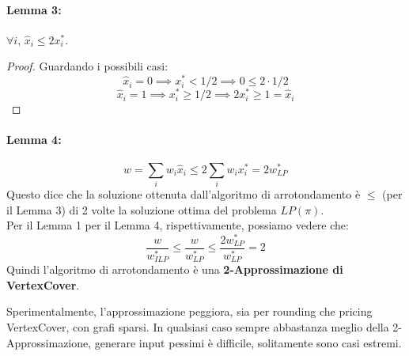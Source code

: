 \newpage

\paragraph{Lemma 3:} $\forall i$, $\hat{x}_i \leq 2x_i^\ast$.\\

\begin{proof}
	Guardando i possibili casi: 
	$$ \hat{x}_i = 0 \implies x_i^\ast < 1/2 \implies 0 \leq 2 \cdot 1/2 $$
	$$ \hat{x}_i = 1 \implies x_i^\ast \geq 1/2 \implies 2x_i^\ast \geq 1 = \hat{x}_i $$
\end{proof}

\paragraph{Lemma 4:}
$$ w = \sum_i w_i \hat{x}_i \leq 2 \sum_i w_i x_i^\ast = 2 w_{LP}^\ast $$
Questo dice che la soluzione ottenuta dall'algoritmo di arrotondamento è $\leq$ (per il Lemma 3) di 2 volte la soluzione ottima del problema $LP(\pi)$.\\

Per il Lemma 1  per il Lemma 4, rispettivamente, possiamo vedere che:
$$ \frac{w}{w_{ILP}^\ast} \leq \frac{w}{w_{LP}^\ast} \leq \frac{2 w^\ast_{LP}}{w^\ast_{LP}} = 2$$
Quindi l'algoritmo di arrotondamento è una \textbf{2-Approssimazione di VertexCover}.\\


\vfill

Sperimentalmente, l'approssimazione peggiora, sia per rounding che pricing VertexCover, con grafi sparsi. In qualsiasi caso sempre abbastanza meglio della 2-Approssimazione, generare input pessimi è difficile, solitamente sono casi estremi.\\

\newpage